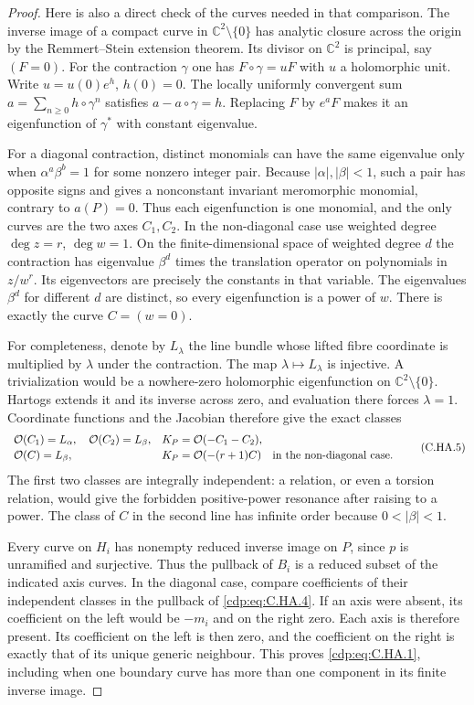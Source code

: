 \begin{proof}
Here is also a direct check of the curves needed in that
comparison. The inverse image of a compact curve in
$\mathbb C^2\setminus\{0\}$ has analytic closure across
the origin by the Remmert--Stein extension theorem. Its
divisor on $\mathbb C^2$ is principal, say $(F=0)$.
For the contraction $\gamma$ one has
$F\circ\gamma=uF$ with $u$ a holomorphic unit. Write
$u=u(0)e^h$, $h(0)=0$. The locally uniformly convergent sum
$a=\sum_{n\geq0}h\circ\gamma^n$ satisfies
$a-a\circ\gamma=h$. Replacing $F$ by $e^aF$ makes it an
eigenfunction of $\gamma^*$ with constant eigenvalue.

For a diagonal contraction, distinct monomials can have
the same eigenvalue only when $\alpha^a\beta^b=1$ for
some nonzero integer pair. Because $|\alpha|,|\beta|<1$,
such a pair has opposite signs and gives a nonconstant
invariant meromorphic monomial, contrary to $a(P)=0$.
Thus each eigenfunction is one monomial, and the only
curves are the two axes $C_1,C_2$. In the non-diagonal
case use weighted degree $\deg z=r$, $\deg w=1$.
On the finite-dimensional space of weighted degree $d$
the contraction has eigenvalue $\beta^d$ times the
translation operator on polynomials in $z/w^r$.
Its eigenvectors are precisely the constants in that
variable. The eigenvalues $\beta^d$ for different $d$
are distinct, so every eigenfunction is a power of $w$.
There is exactly the curve $C=(w=0)$.

For completeness, denote by $L_\lambda$ the line bundle
whose lifted fibre coordinate is multiplied by $\lambda$
under the contraction. The map
$\lambda\mapsto L_\lambda$ is injective. A trivialization
would be a nowhere-zero holomorphic eigenfunction on
$\mathbb C^2\setminus\{0\}$. Hartogs extends it and its
inverse across zero, and evaluation there forces
$\lambda=1$. Coordinate functions and the Jacobian
therefore give the exact classes
\[
\begin{array}{ll}
 \mathcal O(C_1)=L_\alpha,
 \quad\mathcal O(C_2)=L_\beta,
 &K_P=\mathcal O(-C_1-C_2),\\[2pt]
 \mathcal O(C)=L_\beta,
 &K_P=\mathcal O(-(r+1)C)
 \quad\hbox{in the non-diagonal case}.
\end{array}
\tag{C.HA.5}\label{cdp:eq:C.HA.5}
\]
The first two classes are integrally independent: a relation,
or even a torsion relation, would give the forbidden
positive-power resonance after raising to a power.
The class of $C$ in the second line has infinite order
because $0<|\beta|<1$.

Every curve on $H_i$ has nonempty reduced inverse image
on $P$, since $p$ is unramified and surjective. Thus the
pullback of $B_i$ is a reduced subset of the indicated
axis curves. In the diagonal case, compare coefficients
of their independent classes in the pullback of \eqref{cdp:eq:C.HA.4}.
If an axis were absent, its coefficient on the left
would be $-m_i$ and on the right zero. Each axis is
therefore present. Its coefficient on the left is then
zero, and the coefficient on the right is exactly that
of its unique generic neighbour. This proves \eqref{cdp:eq:C.HA.1},
including when one boundary curve has more than one
component in its finite inverse image.


\end{proof}
